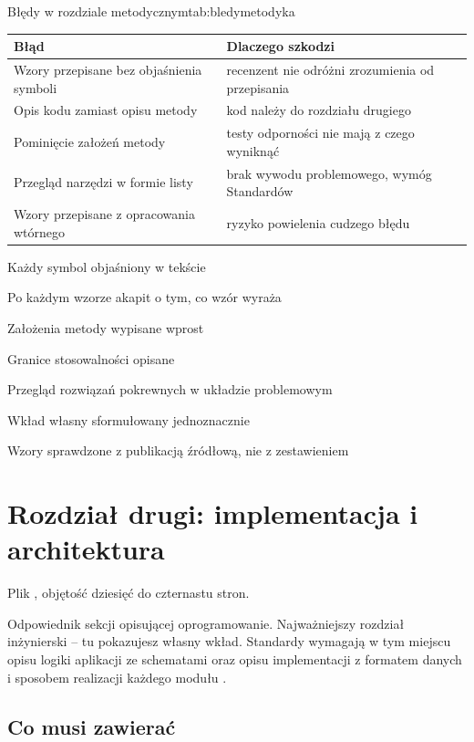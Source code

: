 \begin{tabelaepi}{Błędy w rozdziale metodycznym}{tab:bledymetodyka}
\begin{tabular}{@{}p{6.6cm}p{6.6cm}@{}}
\toprule
Błąd & Dlaczego szkodzi \\
\midrule
Wzory przepisane bez objaśnienia symboli & recenzent nie odróżni zrozumienia od przepisania \\
Opis kodu zamiast opisu metody & kod należy do rozdziału drugiego \\
Pominięcie założeń metody & testy odporności nie mają z czego wyniknąć \\
Przegląd narzędzi w formie listy & brak wywodu problemowego, wymóg Standardów \\
Wzory przepisane z opracowania wtórnego & ryzyko powielenia cudzego błędu \\
\bottomrule
\end{tabular}
\end{tabelaepi}

\begin{kontrolna}
\item Każdy symbol objaśniony w tekście
\item Po każdym wzorze akapit o tym, co wzór wyraża
\item Założenia metody wypisane wprost
\item Granice stosowalności opisane
\item Przegląd rozwiązań pokrewnych w układzie problemowym
\item Wkład własny sformułowany jednoznacznie
\item Wzory sprawdzone z publikacją źródłową, nie z zestawieniem
\end{kontrolna}

\section{Rozdział drugi: implementacja i architektura}

Plik , objętość dziesięć do czternastu stron.

Odpowiednik sekcji opisującej oprogramowanie. Najważniejszy rozdział inżynierski -- tu pokazujesz własny wkład. Standardy wymagają w tym miejscu opisu logiki aplikacji ze schematami oraz opisu implementacji z formatem danych i sposobem realizacji każdego modułu \parencite{standardyEPI}.

\subsection{Co musi zawierać}

